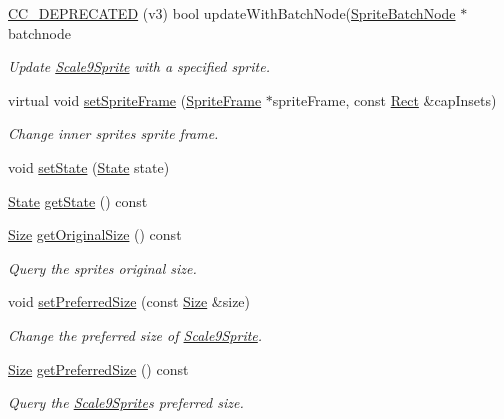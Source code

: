 \begin{DoxyCompactItemize}
\hyperlink{classui_1_1Scale9Sprite_a88772a231a9cf4f4acfa08e745dc560f}{C\+C\+\_\+\+D\+E\+P\+R\+E\+C\+A\+T\+ED} (v3) bool update\+With\+Batch\+Node(\hyperlink{classSpriteBatchNode}{Sprite\+Batch\+Node} $\ast$batchnode
\begin{DoxyCompactList}\small\item\em Update \hyperlink{classui_1_1Scale9Sprite}{Scale9\+Sprite} with a specified sprite. \end{DoxyCompactList}\item 
virtual void \hyperlink{classui_1_1Scale9Sprite_ad57e0c537a9a1bfae4a64b03665528d3}{set\+Sprite\+Frame} (\hyperlink{classSpriteFrame}{Sprite\+Frame} $\ast$sprite\+Frame, const \hyperlink{classRect}{Rect} \&cap\+Insets)
\begin{DoxyCompactList}\small\item\em Change inner sprite\textquotesingle{}s sprite frame. \end{DoxyCompactList}\item 
void \hyperlink{classui_1_1Scale9Sprite_a511b07afa3ccc53fbd2e33f0dca78e8c}{set\+State} (\hyperlink{classui_1_1Scale9Sprite_a6580c2817c63b7a2461c48378b199d79}{State} state)
\item 
\hyperlink{classui_1_1Scale9Sprite_a6580c2817c63b7a2461c48378b199d79}{State} \hyperlink{classui_1_1Scale9Sprite_a9691739d94e41e98acceb0465d2e24bd}{get\+State} () const
\item 
\hyperlink{classSize}{Size} \hyperlink{classui_1_1Scale9Sprite_aa16747ee73288990f4c2c9978bb3f562}{get\+Original\+Size} () const
\begin{DoxyCompactList}\small\item\em Query the sprite\textquotesingle{}s original size. \end{DoxyCompactList}\item 
void \hyperlink{classui_1_1Scale9Sprite_a9e5d4a2ad1a4caa99335029fb7d17762}{set\+Preferred\+Size} (const \hyperlink{classSize}{Size} \&size)
\begin{DoxyCompactList}\small\item\em Change the preferred size of \hyperlink{classui_1_1Scale9Sprite}{Scale9\+Sprite}. \end{DoxyCompactList}\item 
\hyperlink{classSize}{Size} \hyperlink{classui_1_1Scale9Sprite_abbcebd3c0338291ff887b98399133384}{get\+Preferred\+Size} () const
\begin{DoxyCompactList}\small\item\em Query the \hyperlink{classui_1_1Scale9Sprite}{Scale9\+Sprite}\textquotesingle{}s preferred size. \end{DoxyCompactList}\item 

\end{DoxyCompactItemize}

